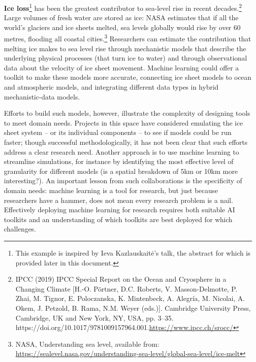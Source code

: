 \textbf{Ice loss}\footnote{This example is inspired by Ieva
  Kazlauskaitė's talk, the abstract for which is provided later in this
  document.} has been the greatest contributor to sea-level rise in
recent decades.\footnote{IPCC (2019) IPCC Special Report on the Ocean
  and Cryosphere in a Changing Climate {[}H.-O. Pörtner, D.C. Roberts,
  V. Masson-Delmotte, P. Zhai, M. Tignor, E. Poloczanska, K. Mintenbeck,
  A. Alegría, M. Nicolai, A. Okem, J. Petzold, B. Rama, N.M. Weyer
  (eds.){]}. Cambridge University Press, Cambridge, UK and New York, NY,
  USA, pp. 3--35.
  https://doi.org/10.1017/9781009157964.001.\href{https://www.ipcc.ch/srocc/}{\uline{https://www.ipcc.ch/srocc/}}}
Large volumes of fresh water are stored as ice: NASA estimates that if
all the world's glaciers and ice sheets melted, sea levels globally
would rise by over 60 metres, flooding all coastal cities.\footnote{NASA,
  Understanding sea level, available from:
  \href{https://sealevel.nasa.gov/understanding-sea-level/global-sea-level/ice-melt}{\uline{https://sealevel.nasa.gov/understanding-sea-level/global-sea-level/ice-melt}}}
Researchers can estimate the contribution that melting ice makes to sea
level rise through mechanistic models that describe the underlying
physical processes (that turn ice to water) and through observational
data about the velocity of ice sheet movement. Machine learning could
offer a toolkit to make these models more accurate, connecting ice sheet
models to ocean and atmospheric models, and integrating different data
types in hybrid mechanistic-data models.

Efforts to build such models, however, illustrate the complexity of
designing tools to meet domain needs. Projects in this space have
considered emulating the ice sheet system -- or its individual
components -- to see if models could be run faster; though successful
methodologically, it has not been clear that such efforts address a
clear research need. Another approach is to use machine learning to
streamline simulations, for instance by identifying the most effective
level of granularity for different models (is a spatial breakdown of 5km
or 10km more interesting?). An important lesson from such collaborations
is the specificity of domain needs: machine learning is a tool for
research, but just because researchers have a hammer, does not mean
every research problem is a nail. Effectively deploying machine learning
for research requires both suitable AI toolkits and an understanding of
which toolkits are best deployed for which challenges.

